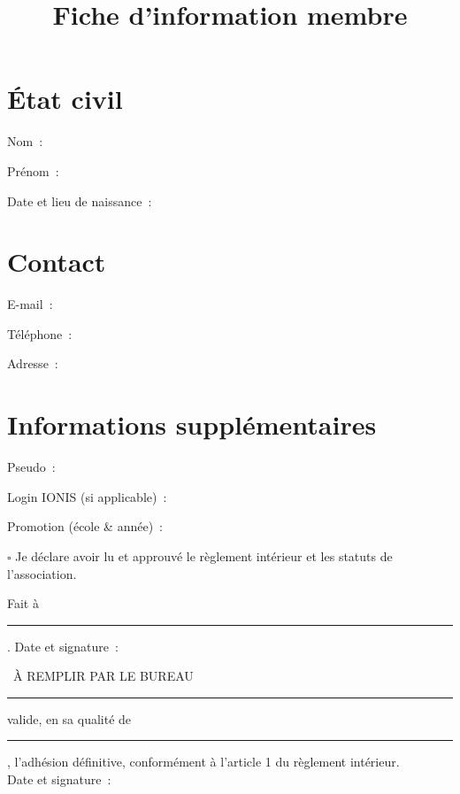 \documentclass[a4paper,12pt, nodate]{prologin}
\title{Fiche d'information membre}
\begin{document}
\section*{État civil}

Nom~: \hrulefill

Prénom~: \hrulefill

Date et lieu de naissance~: \hrulefill

\section*{Contact}

E-mail~: \hrulefill

Téléphone~: \hrulefill

Adresse~: \hrulefill

\hrulefill

\section*{Informations supplémentaires}
Pseudo~: \hrulefill

Login IONIS (si applicable)~: \hrulefill

Promotion (école \& année)~: \hrulefill

\vspace{0.2cm}

\noindent
$\square$ Je déclare avoir lu et approuvé le règlement intérieur et les statuts de l'association.

\vspace{0.2cm}

\noindent
Fait à \rule{5cm}{0.4pt}.
\newline
Date et signature~:

\vspace{1.5cm}

\noindent
\hrulefill~À REMPLIR PAR LE BUREAU~\hrulefill

\vspace{0.7cm}

\noindent
\rule{4cm}{0.4pt} valide, en sa qualité de \rule{3.2cm}{0.4pt}, l'adhésion définitive, conformément à l'article 1 du règlement intérieur. \\
Date et signature~:


\newpage
\end{document}
